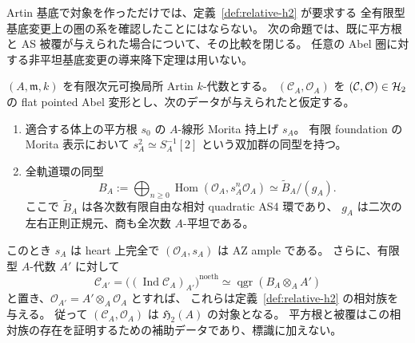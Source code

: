 Artin 基底で対象を作っただけでは、定義~\ref{def:relative-h2} が要求する
全有限型基底変更上の圏の系を確認したことにはならない。
次の命題では、既に平方根と AS 被覆が与えられた場合について、その比較を閉じる。
任意の Abel 圏に対する非平坦基底変更の導来降下定理は用いない。

\begin{proposition}
\label{prop:artin-witness-relative-promotion}
$(A,\mathfrak m,k)$ を有限次元可換局所 Artin $k$-代数とする。
$(\mathcal C_A,\mathcal O_A)$ を $(\mathcal C,\mathcal O)\in\mathcal H_2$ の
flat pointed Abel 変形とし、次のデータが与えられたと仮定する。
\begin{enumerate}
\item 適合する体上の平方根 $s_0$ の $A$-線形 Morita 持上げ $s_A$。
  有限 foundation の Morita 表示において
  $s_A^2\simeq S_A^{-1}[2]$ という双加群の同型を持つ。
\item 全軌道環の同型
  \[
   B_A:=\bigoplus_{n\ge0}
     \operatorname{Hom}(\mathcal O_A,s_A^n\mathcal O_A)
   \simeq\widetilde B_A/(g_A).
  \]
  ここで $\widetilde B_A$ は各次数有限自由な相対 quadratic AS4 環であり、
  $g_A$ は二次の左右正則正規元、商も全次数 $A$-平坦である。
\end{enumerate}
このとき $s_A$ は heart 上完全で $(\mathcal O_A,s_A)$ は AZ ample である。
さらに、有限型 $A$-代数 $A'$ に対して
\[
 \mathcal C_{A'}=
 \bigl((\operatorname{Ind}\mathcal C_A)_{A'}\bigr)^{\mathrm{noeth}}
 \simeq \operatorname{qgr}(B_A\otimes_A A')
\]
と置き、$\mathcal O_{A'}=A'\otimes_A\mathcal O_A$ とすれば、
これらは定義~\ref{def:relative-h2} の相対族を与える。
従って $(\mathcal C_A,\mathcal O_A)$ は $\mathfrak H_2(A)$ の対象となる。
平方根と被覆はこの相対族の存在を証明するための補助データであり、標識に加えない。
\end{proposition}

